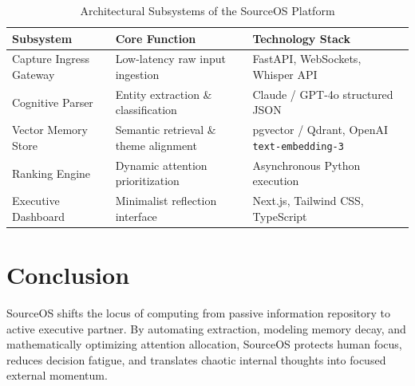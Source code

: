 \documentclass[11pt,a4paper]{article}
\begin{document}
\begin{table}[htbp]
\centering
\caption{Architectural Subsystems of the SourceOS Platform}
\label{tab:sourceos_arch}
\begin{tabular}{lll}
\toprule
\textbf{Subsystem} & \textbf{Core Function} & \textbf{Technology Stack} \\
\midrule
Capture Ingress Gateway & Low-latency raw input ingestion & FastAPI, WebSockets, Whisper API \\
Cognitive Parser & Entity extraction \& classification & Claude / GPT-4o structured JSON \\
Vector Memory Store & Semantic retrieval \& theme alignment & pgvector / Qdrant, OpenAI \texttt{text-embedding-3} \\
Ranking Engine & Dynamic attention prioritization & Asynchronous Python execution \\
Executive Dashboard & Minimalist reflection interface & Next.js, Tailwind CSS, TypeScript \\
\bottomrule
\end{tabular}
\end{table}

\section{Conclusion}
SourceOS shifts the locus of computing from passive information repository to active executive partner. By automating extraction, modeling memory decay, and mathematically optimizing attention allocation, SourceOS protects human focus, reduces decision fatigue, and translates chaotic internal thoughts into focused external momentum.



\end{document}
